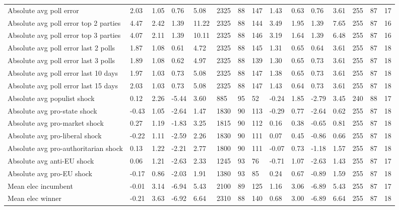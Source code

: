 \begin{longtable}{lllllllllllllll}
Absolute avg poll error & 2.03 & 1.05 & 0.76 & 5.08 & 2325 & 88 & 147 & 1.43 & 0.63 & 0.76 & 3.61 & 255 & 87 & 17\\
Absolute avg poll error top 2 parties & 4.47 & 2.42 & 1.39 & 11.22 & 2325 & 88 & 144 & 3.49 & 1.95 & 1.39 & 7.65 & 255 & 87 & 16\\
Absolute avg poll error top 3 parties & 4.07 & 2.11 & 1.39 & 10.11 & 2325 & 88 & 146 & 3.19 & 1.64 & 1.39 & 6.48 & 255 & 87 & 16\\
\addlinespace
Absolute avg poll error last 2 polls & 1.87 & 1.08 & 0.61 & 4.72 & 2325 & 88 & 145 & 1.31 & 0.65 & 0.64 & 3.61 & 255 & 87 & 18\\
Absolute avg poll error last 3 polls & 1.89 & 1.08 & 0.62 & 4.97 & 2325 & 88 & 139 & 1.30 & 0.65 & 0.73 & 3.61 & 255 & 87 & 18\\
Absolute avg poll error last 10 days & 1.97 & 1.03 & 0.73 & 5.08 & 2325 & 88 & 147 & 1.38 & 0.65 & 0.73 & 3.61 & 255 & 87 & 18\\
Absolute avg poll error last 15 days & 2.03 & 1.03 & 0.73 & 5.08 & 2325 & 88 & 147 & 1.43 & 0.64 & 0.73 & 3.61 & 255 & 87 & 18\\
Absolute avg populist shock & 0.12 & 2.26 & -5.44 & 3.60 & 885 & 95 & 52 & -0.24 & 1.85 & -2.79 & 3.45 & 240 & 88 & 17\\
\addlinespace
Absolute avg pro-state shock & -0.43 & 1.05 & -2.64 & 1.47 & 1830 & 90 & 113 & -0.29 & 0.77 & -2.64 & 0.62 & 255 & 87 & 18\\
Absolute avg pro-market shock & 0.27 & 1.19 & -1.83 & 3.25 & 1815 & 90 & 112 & 0.16 & 0.38 & -0.65 & 0.81 & 255 & 87 & 18\\
Absolute avg pro-liberal shock & -0.22 & 1.11 & -2.59 & 2.26 & 1830 & 90 & 111 & 0.07 & 0.45 & -0.86 & 0.66 & 255 & 87 & 18\\
Absolute avg pro-authoritarian shock & 0.13 & 1.22 & -2.21 & 2.77 & 1800 & 90 & 111 & -0.07 & 0.73 & -1.18 & 1.57 & 255 & 87 & 18\\
Absolute avg anti-EU shock & 0.06 & 1.21 & -2.63 & 2.33 & 1245 & 93 & 76 & -0.71 & 1.07 & -2.63 & 1.43 & 255 & 87 & 17\\
\addlinespace
Absolute avg pro-EU shock & -0.17 & 0.86 & -2.03 & 1.91 & 1380 & 93 & 85 & 0.24 & 0.67 & -0.89 & 1.59 & 255 & 87 & 18\\
Mean elec incumbent & -0.01 & 3.14 & -6.94 & 5.43 & 2100 & 89 & 125 & 1.16 & 3.06 & -6.89 & 5.43 & 255 & 87 & 17\\
Mean elec winner & -0.21 & 3.63 & -6.92 & 6.64 & 2310 & 88 & 140 & 0.68 & 3.00 & -6.89 & 6.64 & 255 & 87 & 18\\

\end{longtable}

